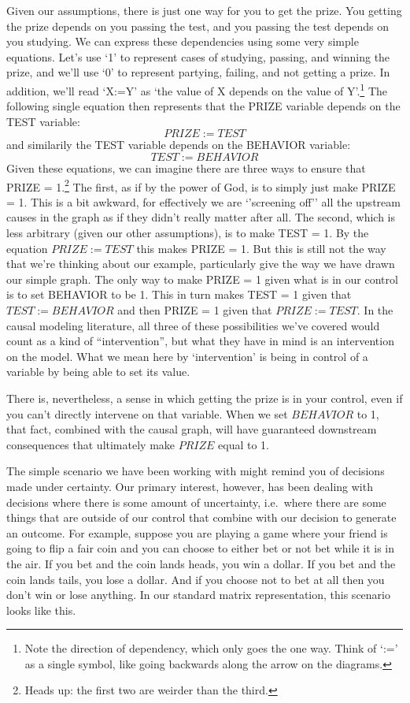 \documentclass[]{tufte-book}
\begin{document}
Given our assumptions, there is just one way for you to get the prize. You getting the prize depends on you passing the test, and you passing the test depends on you studying. We can express these dependencies using some very simple equations. Let's use `1' to represent cases of studying, passing, and winning the prize, and we'll use `0' to represent partying, failing, and not getting a prize. In addition, we'll read `X:=Y' as `the value of X depends on the value of Y'.\footnote{Note the direction of dependency, which only goes the one way. Think of `:=' as a single symbol, like going backwards along the arrow on the diagrams.} The following single equation then represents that the PRIZE variable depends on the TEST variable:
\[
PRIZE := TEST
\]
and similarily the TEST variable depends on the BEHAVIOR variable:
\[
TEST := BEHAVIOR
\]
Given these equations, we can imagine there are three ways to ensure that PRIZE = 1.\footnote{Heads up: the first two are weirder than the third.} The first, as if by the power of God, is to simply just make PRIZE = 1. This is a bit awkward, for effectively we are `'screening off'' all the upstream causes in the graph as if they didn't really matter after all. The second, which is less arbitrary (given our other assumptions), is to make TEST = 1. By the equation \(PRIZE := TEST\) this makes PRIZE = 1. But this is still not the way that we're thinking about our example, particularly give the way we have drawn our simple graph. The only way to make PRIZE = 1 given what is in our control is to set BEHAVIOR to be 1. This in turn makes TEST = 1 given that \(TEST:= BEHAVIOR\) and then PRIZE = 1 given that \(PRIZE:=TEST\). In the causal modeling literature, all three of these possibilities we've covered would count as a kind of ``intervention'', but what they have in mind is an intervention on the model. What we mean here by `intervention' is being in control of a variable by being able to set its value.

There is, nevertheless, a sense in which getting the prize is in your control, even if you can't directly intervene on that variable. When we set \(BEHAVIOR\) to 1, that fact, combined with the causal graph, will have guaranteed downstream consequences that ultimately make \(PRIZE\) equal to 1.

The simple scenario we have been working with might remind you of decisions made under certainty. Our primary interest, however, has been dealing with decisions where there is some amount of uncertainty, i.e.~where there are some things that are outside of our control that combine with our decision to generate an outcome. For example, suppose you are playing a game where your friend is going to flip a fair coin and you can choose to either bet or not bet while it is in the air. If you bet and the coin lands heads, you win a dollar. If you bet and the coin lands tails, you lose a dollar. And if you choose not to bet at all then you don't win or lose anything. In our standard matrix representation, this scenario looks like this.
\end{document}
